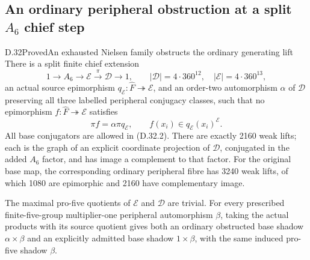 \subsection{An ordinary peripheral obstruction at a split \texorpdfstring{$A_6$}{A6} chief step}

\begin{statement}{D.32}{Proved}{An exhausted Nielsen family obstructs the ordinary generating lift}
There is a split finite chief extension
\[
 1\longrightarrow A_6\longrightarrow\mathcal E
       \xrightarrow{\pi}\mathcal D\longrightarrow1,
 \qquad
 |\mathcal D|=4\cdot360^{12},\quad
 |\mathcal E|=4\cdot360^{13},
 \tag{D.32.1}
\]
an actual source epimorphism
$q_{\mathcal E}:\widehat F\twoheadrightarrow\mathcal E$,
and an order-two automorphism
$\alpha$ of $\mathcal D$ preserving all three
labelled peripheral conjugacy classes, such
that no epimorphism
$f:\widehat F\twoheadrightarrow\mathcal E$
satisfies
\[
 \pi f=\alpha\pi q_{\mathcal E},\qquad
                 f(x_i)\in q_{\mathcal E}(x_i)^{\mathcal E}.
 \tag{D.32.2}
\]
All base conjugators are allowed in
\textup{(D.32.2)}.
There are exactly 2160 weak lifts; each
is the graph of an explicit coordinate
projection of $\mathcal D$, conjugated
in the added $A_6$ factor, and has image
a complement to that factor.
For the original base map, the corresponding
ordinary peripheral fibre has 3240 weak
lifts, of which 1080 are epimorphic and
2160 have complementary image.

The maximal pro-five quotients of
$\mathcal E$ and $\mathcal D$ are trivial.
For every prescribed finite-five-group
multiplier-one peripheral automorphism
$\beta$, taking the actual products with
its source quotient gives both an ordinary
obstructed base shadow $\alpha\times\beta$
and an explicitly admitted base shadow
$1\times\beta$, with the same induced
pro-five shadow $\beta$.
\end{statement}

